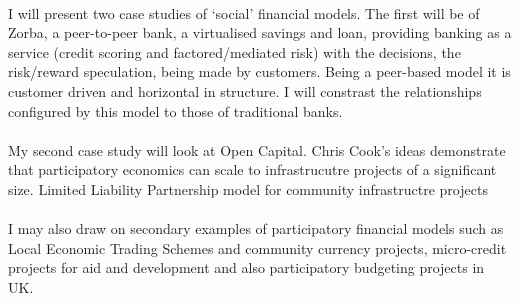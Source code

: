 \documentclass{article}
\begin{document}
\begin{doublespacing}
\paragraph{}I will present two case studies of `social' financial models. The first will be of Zorba, a peer-to-peer bank, a virtualised savings and loan, providing banking as a service (credit scoring and factored/mediated risk) with the decisions, the risk/reward speculation, being made by customers. Being a peer-based model it is customer driven and horizontal in structure. I will constrast the relationships configured by this model to those of traditional banks.

\paragraph{}My second case study will look at Open Capital. Chris Cook's ideas demonstrate that participatory economics can scale to infrastrucutre projects of a significant size.  Limited Liability Partnership model for community infrastructre projects

\paragraph{}I may also draw on secondary examples of participatory financial models such as Local Economic Trading Schemes and community currency projects, micro-credit projects for aid and development and also participatory budgeting projects in UK.

\end{doublespacing}
\end{document}

